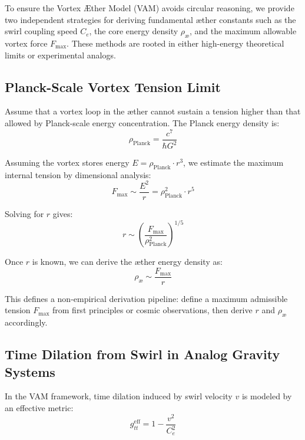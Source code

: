 \documentclass[a4paper,12pt]{article}
\begin{document}
        To ensure the Vortex Æther Model (VAM) avoids circular reasoning, we provide two independent strategies for deriving fundamental æther constants such as the swirl coupling speed $C_e$, the core energy density $\rho_{\text{æ}}$, and the maximum allowable vortex force $F_{\max}$. These methods are rooted in either high-energy theoretical limits or experimental analogs.

        \subsection{ Planck-Scale Vortex Tension Limit}

        Assume that a vortex loop in the æther cannot sustain a tension higher than that allowed by Planck-scale energy concentration. The Planck energy density is:
        \begin{equation}
            \rho_{\text{Planck}} = \frac{c^7}{\hbar G^2}
        \end{equation}

        Assuming the vortex stores energy $E = \rho_{\text{Planck}} \cdot r^3$, we estimate the maximum internal tension by dimensional analysis:
        \begin{equation}
            F_{\max} \sim \frac{E^2}{r} = \rho_{\text{Planck}}^2 \cdot r^5
        \end{equation}

        Solving for $r$ gives:
        \begin{equation}
            r \sim \left( \frac{F_{\max}}{\rho_{\text{Planck}}^2} \right)^{1/5}
        \end{equation}

        Once $r$ is known, we can derive the æther energy density as:
        \begin{equation}
            \rho_{\text{æ}} \sim \frac{F_{\max}}{r}
        \end{equation}

        This defines a non-empirical derivation pipeline: define a maximum admissible tension $F_{\max}$ from first principles or cosmic observations, then derive $r$ and $\rho_{\text{æ}}$ accordingly.

        \subsection{ Time Dilation from Swirl in Analog Gravity Systems}

        In the VAM framework, time dilation induced by swirl velocity $v$ is modeled by an effective metric:
        \begin{equation}
            g_{tt}^{\text{eff}} = 1 - \frac{v^2}{C_e^2}
        \end{equation}
\end{document}
